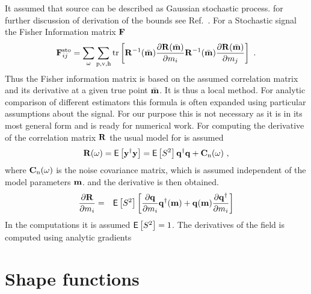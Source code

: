 \documentclass{saclantc}
\newcommand{\E}{{\sf E}}
\begin{document}
It assumed that source can be described as 
 Gaussian stochastic process. for further
discussion of derivation of the bounds see Ref.\ \cite{ottersten, baggeroer:asa89}.
For a Stochastic signal the Fisher Information matrix $\bf F$
\begin{equation}
{\bf F}_{ij}^{\rm sto} = \sum_{\omega} \sum_{ \rm p,v,h} \mbox{tr}\left[
     {\bf R}^{-1}(\bar{\bf m}) 
                     \frac{\partial{\bf R}(\bar{\bf m})}{\partial m_i} 
     {\bf R}^{-1}(\bar{\bf m}) 
                     \frac{\partial{\bf R}(\bar{\bf m})}{\partial m_j} 
\right]~.
\label{eq:crb-sto}
\end{equation}
Thus the Fisher information matrix is based on the assumed
correlation matrix and its derivative at a given true point $\bar{\bf m}$. It is thus a local method.
For analytic comparison of different estimators this formula is often
expanded using particular assumptions about the signal. For our purpose
this is not necessary as it is in its most general form and is ready
for numerical work.
For computing the 
 derivative of the correlation matrix ${\bf R}$ the usual model for 
   is assumed 
\begin{equation}
{\bf R} (\omega) = \E \left[{{\bf y}^\dagger{\bf y}}  \right] = 
\E \left[ {S^2} \right]{\bf q}^\dagger {\bf q} + {\bf C}_{\rm n}(\omega)~,
\label{eq:cor}
\end{equation}
where ${\bf C}_{\rm n}(\omega)$ is the noise covariance matrix, which
is assumed independent of the model parameters $\bf m$.
and the derivative is then obtained.
\begin{eqnarray}
\frac{\partial{\bf R}}{\partial {m}_i} &=& \E\left[ {S^2} \right]   
\left[         
\frac{\partial{\bf q}}{\partial {m}_i} {\bf q}^\dagger({\bf m})
+{\bf q}({\bf m}) \frac{\partial{\bf q}^\dagger}{\partial { m}_i}\right]
\end{eqnarray}
In the computations it is assumed $\E\left[ {S^2} \right]=1$. The
derivatives of the field is computed using analytic gradients
\cite{gerstoft:asa95}  



\section{Shape functions}
\label{se:eof}
\end{document}
